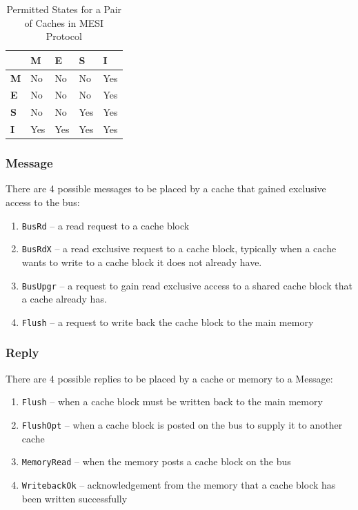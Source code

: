 \documentclass[nonacm,acmsmall,screen,11pt]{acmart}
\begin{document}
\begin{table}[htb!]
  \centering
  \caption{Permitted States for a Pair of Caches in MESI Protocol}
  \label{tab:mesi}
  \begin{tabular}{|l|l|l|l|l|}
    \hline
               & \textbf{M} & \textbf{E} & \textbf{S} & \textbf{I} \\ \hline
    \textbf{M} & No         & No         & No         & Yes        \\ \hline
    \textbf{E} & No         & No         & No         & Yes        \\ \hline
    \textbf{S} & No         & No         & Yes        & Yes        \\ \hline
    \textbf{I} & Yes        & Yes        & Yes        & Yes        \\ \hline
  \end{tabular}
\end{table}

\subsubsection{Message}
There are 4 possible messages to be placed by a cache that gained exclusive access to the bus:
\begin{enumerate}
  \item \texttt{BusRd} -- a read request to a cache block
  \item \texttt{BusRdX} -- a read exclusive request to a cache block, typically when a cache wants to write to a cache block it does not already have.
  \item \texttt{BusUpgr} -- a request to gain read exclusive access to a shared cache block that a cache already has.
  \item \texttt{Flush} -- a request to write back the cache block to the main memory
\end{enumerate}

\subsubsection{Reply}
There are 4 possible replies to be placed by a cache or memory to a Message:
\begin{enumerate}
  \item \texttt{Flush} -- when a cache block must be written back to the main memory
  \item \texttt{FlushOpt} -- when a cache block is posted on the bus to supply it to another cache
  \item \texttt{MemoryRead} -- when the memory posts a cache block on the bus
  \item \texttt{WritebackOk} -- acknowledgement from the memory that a cache block has been written successfully
\end{enumerate}
\end{document}
